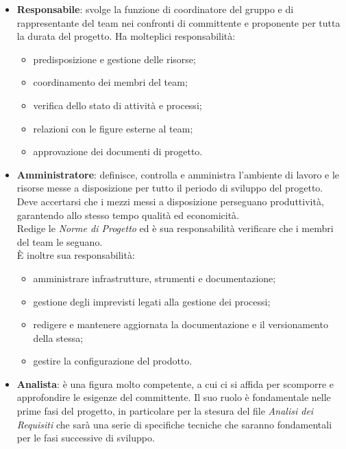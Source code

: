         \begin{itemize}
            \item \textbf{Responsabile}: svolge la funzione di coordinatore del gruppo e di rappresentante del team nei confronti di committente e proponente per tutta la durata del progetto. Ha molteplici responsabilità:
            \begin{itemize}
                \item predisposizione e gestione delle risorse;
                \item coordinamento dei membri del team;
                \item verifica dello stato di attività e processi;
                \item relazioni con le figure esterne al team;
                \item approvazione dei documenti di progetto.
            \end{itemize}
            \item \textbf{Amministratore}: definisce, controlla e amministra l'ambiente di lavoro e le risorse messe a disposizione per tutto il periodo di sviluppo del progetto.
            Deve accertarsi che i mezzi messi a disposizione perseguano produttività, garantendo allo stesso tempo qualità ed economicità. \\
            Redige le \emph{Norme di Progetto} ed è sua responsabilità verificare che i membri del team le seguano. \\
            \`E inoltre sua responsabilità:
            \begin{itemize}
                \item amministrare infrastrutture, strumenti e documentazione;
                \item gestione degli imprevisti legati alla gestione dei processi;
                \item redigere e mantenere aggiornata la documentazione e il versionamento della stessa;
                \item gestire la configurazione del prodotto.
            \end{itemize}
            \item \textbf{Analista}: \`e una figura molto competente, a cui ci si affida per scomporre e approfondire le esigenze del committente. Il suo ruolo è fondamentale nelle prime fasi del progetto, in particolare per la stesura del file \emph{Analisi dei Requisiti} che sarà una serie di specifiche tecniche che saranno fondamentali per le fasi successive di sviluppo. \\

\end{itemize}
